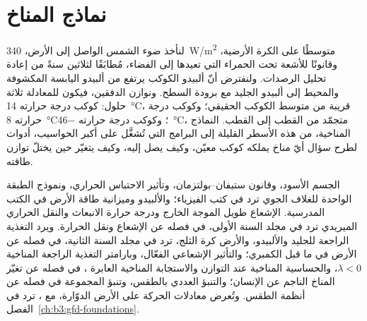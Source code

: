 \chapter{نماذج المناخ}\label{ch:b3:climate-models}

لنأخذ ضوء الشمس الواصل إلى الأرض، \qty{340}{W/m^2} متوسطًا على الكرة
الأرضية، وقانونًا للأشعة تحت الحمراء التي تعيدها إلى الفضاء، مُطابَقًا
لثلاثين سنةً من إعادة تحليل الرصدات. ولنفترض أنّ ألبيدو الكوكب يرتفع من ألبيدو
اليابسة المكشوفة والمحيط إلى ألبيدو الجليد مع برودة السطح. ونوازن الدفقين،
فيكون للمعادلة ثلاثة حلول: كوكب درجة حرارته
\qty{14}{\celsius}، قريبة من متوسط الكوكب الحقيقي؛ وكوكب درجة حرارته
\qty{8}{\celsius}؛ وكوكب درجة حرارته \qty{-46}{\celsius}، متجمّد من القطب إلى
القطب. النماذج المناخية، من هذه الأسطر القليلة إلى البرامج التي تُشغَّل على أكبر
الحواسيب، أدوات لطرح سؤال أيّ مناخ يملكه كوكب معيّن، وكيف يصل إليه،
وكيف يتغيّر حين يختلّ توازن طاقته.

\begin{recall}
الجسم الأسود، وقانون ستيفان--بولتزمان، وتأثير الاحتباس الحراري، ونموذج الطبقة الواحدة للغلاف الجوي
ترد في كتب الفيزياء؛ والألبيدو
وميزانية طاقة الأرض في الكتب المدرسية. الإشعاع طويل الموجة الخارج
ودرجة حرارة الانبعاث والنقل الحراري الميريدي ترد
في مجلد السنة الأولى، في فصله عن الإشعاع ونقل الحرارة. ويرد
التغذية الراجعة للجليد والألبيدو، والأرض كرة الثلج، ترد في مجلد السنة الثانية، في
فصله عن الأرض في ما قبل الكمبري؛ والتأثير الإشعاعي الفعّال،
وبارامتر التغذية الراجعة المناخية $\lambda < 0$، والحساسية المناخية عند التوازن
 والاستجابة المناخية العابرة ، في فصله عن
تغيّر المناخ الناجم عن الإنسان؛ والتنبؤ العددي بالطقس،
وتنبؤ المجموعة في فصله عن أنظمة الطقس. وتُعرض معادلات
الحركة على الأرض الدوّارة، مع ، ترد في
الفصل~\ref{ch:b3:gfd-foundations}.
\end{recall}

